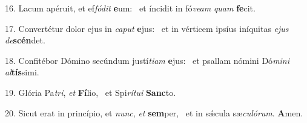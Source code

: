16. Lacum apéruit, et ef\textit{fó}\textit{dit} \textbf{e}um: \ast\  et íncidit in fó\textit{ve}\textit{am} \textit{quam} \textbf{fe}cit.\

17. Convertétur dolor ejus in \textit{ca}\textit{put} \textbf{e}jus: \ast\  et in vérticem ipsíus iníquitas \textit{e}\textit{jus} \textit{de}\textbf{scén}det.\

18. Confitébor Dómino secúndum justí\textit{ti}\textit{am} \textbf{e}jus: \ast\  et psallam nómini Dó\textit{mi}\textit{ni} \textit{al}\textbf{tís}simi.\

19. Glória Pa\textit{tri}, \textit{et} \textbf{Fí}lio, \ast\  et Spi\textit{rí}\textit{tu}\textit{i} \textbf{Sanc}to.\

20. Sicut erat in princípio, et \textit{nunc}, \textit{et} \textbf{sem}per, \ast\  et in sǽcula sæ\textit{cu}\textit{ló}\textit{rum}. \textbf{A}men.\

